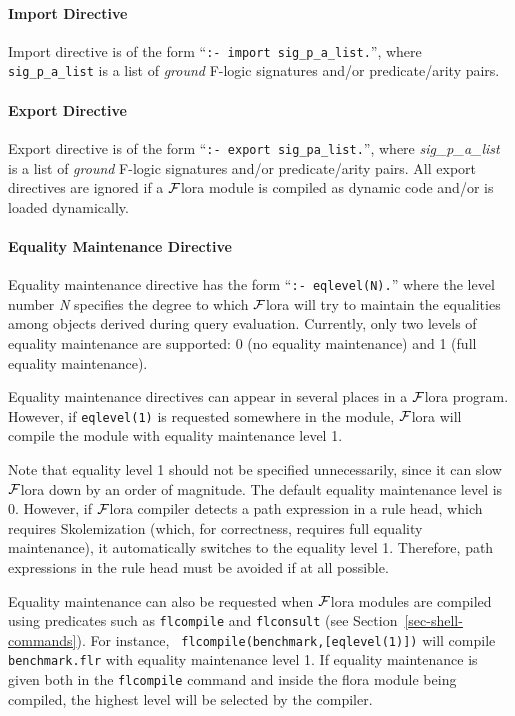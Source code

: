 \documentclass[11pt]{article}
\newcommand{\FLORA}{{\mbox{${\cal F}${\sc lora}}}\xspace}
\newcommand{\fl}{{F-logic}\xspace}
\begin{document}
\paragraph{Import Directive} Import directive is of the form
``{\tt :- import sig\_p\_a\_list.}'', where {\tt sig\_p\_a\_list} is a
list of \emph{ground} \fl signatures \mbox{and/or} \mbox{predicate/arity}
pairs.

\paragraph{Export Directive} Export directive is of the form
``{\tt :- export sig\_pa\_list.}'', where \emph{sig\_p\_a\_list} is a list of
\emph{ground} \fl signatures \mbox{and/or} \mbox{predicate/arity} pairs.
All export directives are ignored if a \FLORA module is compiled as dynamic
code and/or is loaded dynamically.

\paragraph{Equality Maintenance Directive} Equality maintenance directive has
the form ``{\tt :- eqlevel(N).}''  where the level number \emph{N}
specifies the degree to which \FLORA will try to maintain the equalities
among objects derived during query evaluation. Currently, only two levels
of equality maintenance are supported: 0 (no equality maintenance) and 1
(full equality maintenance).

Equality maintenance directives can appear in several places in a \FLORA
program. However, if  {\tt eqlevel(1)} is requested somewhere in the
module, \FLORA will compile the module with equality maintenance
level 1.

Note that equality level 1 should not be specified unnecessarily, since it
can slow \FLORA down by an order of magnitude.  The default equality
maintenance level is 0. However, if \FLORA compiler detects a path
expression in a rule head, which requires Skolemization (which, for
correctness, requires full equality maintenance), it automatically switches
to the equality level 1.  Therefore, path expressions in the rule head must
be avoided if at all possible.

Equality maintenance can also be requested when \FLORA modules are compiled
using predicates such as {\tt flcompile} and {\tt flconsult} (see
Section~\ref{sec-shell-commands}). For instance, {\tt
  flcompile(benchmark,[eqlevel(1)])} will compile {\tt benchmark.flr} with
equality maintenance level 1.  If equality maintenance is given both in the
{\tt flcompile} command and inside the flora module being compiled, the
highest level will be selected by the compiler.
\end{document}
